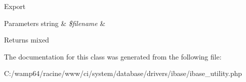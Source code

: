 Export


\begin{DoxyParams}[1]{Parameters}
string & {\em \$filename} & \\
\hline
\end{DoxyParams}
\begin{DoxyReturn}{Returns}
mixed 
\end{DoxyReturn}


The documentation for this class was generated from the following file\+:\begin{DoxyCompactItemize}
\item 
C\+:/wamp64/racine/www/ci/system/database/drivers/ibase/ibase\+\_\+utility.\+php\end{DoxyCompactItemize}
